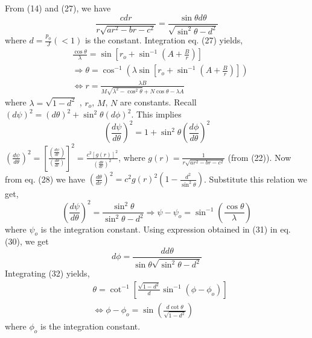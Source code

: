 \documentclass[conference]{IEEEtran}
\begin{document}
From (14) and (27), we have \begin{dmath} \frac{c dr}{r\sqrt{ar^{2} - br - c^{2}}} = \frac{\sin{\theta} d\theta}{\sqrt{\sin^{2}{\theta} - d^{2}}}\end{dmath} where $d = \frac{p_{\phi}}{J} \left( < 1\right)$ is the constant. 
Integration eq. (27) yields, 
\begin{equation}
    \begin{split}
 &\frac{\cos{\theta}}{\lambda} = \sin{\left[r_{o} + \sin^{-1}{\left(A + \frac{B}{r}\right)}\right]} \\
 &\Rightarrow \theta = \cos^{-1}\left({\lambda\sin{\left[r_{o} + \sin^{-1}{\left(A + \frac{B}{r}\right)}\right]}}\right) \\
 &\Longleftrightarrow r = \frac{\lambda B}{M\sqrt{\lambda^{2} - \cos^{2}{\theta}} + N\cos{\theta} - \lambda A}
 \end{split}
 \end{equation} where $\lambda = \sqrt{1 - d^{2}}$ , $r_{o}$, $M$, $N$ are constants. 
Recall $\left(d\psi\right)^{2} = \left(d\theta\right)^{2} + \sin^{2}{\theta}\left(d\phi\right)^{2}$. This implies \begin{dmath}\left(\frac{d\psi}{d \theta}\right)^{2} = 1 + \sin^{2}{\theta}\left(\frac{d\phi}{d \theta}\right)^{2}\end{dmath} 
$\left(\frac{d\psi}{d \theta}\right)^{2} = \left[\frac{\left(\frac{d\psi}{d r}\right)}{\left(\frac{d\theta}{d r}\right)}\right]^{2} = \frac{c^{2}\left[g(r)\right]^{2}}{\left(\frac{d\theta}{d r}\right)^{2}}$, where $g(r) = \frac{1}{r\sqrt{ar^{2} - br - c^{2}}}$ (from (22)). Now from eq. (28) we have $\left(\frac{d\theta}{d r}\right)^{2} = c^{2}g(r)^{2}\left(1 - \frac{d^{2}}{\sin^{2}{\theta}}\right)$. Substitute this relation we get,
\begin{equation}
\left(\frac{d\psi}{d \theta}\right)^{2} = \frac{\sin^{2}{\theta}}{\sin^{2}{\theta} - d^{2}}
\Rightarrow \psi- \psi_{o} = \sin^{-1}{\left(\frac{\cos{\theta}}{\lambda}\right)}
\end{equation} where $\psi_{o}$ is the integration constant.   
Using expression obtained in (31) in eq. (30), we get \begin{dmath} d\phi =  \frac{d  d\theta}{\sin{\theta}{\sqrt{\sin^{2}{\theta} - d^{2}}}}\end{dmath} Integrating (32) yields, 
\begin{equation}
\begin{split}
&\theta = \cot^{-1}{\left[\frac{\sqrt{1 - d^{2}}}{d}\sin^{-1}{\left(\phi - \phi_{o} \right)}\right]} \\ &\Longleftrightarrow \phi - \phi_{o} = \sin{\left(\frac{d \cot{\theta}}{\sqrt{1 - d^{2}}}\right)}
\end{split}
\end{equation} where $\phi_{o}$ is the integration constant.
\vspace{1em}
\end{document}
